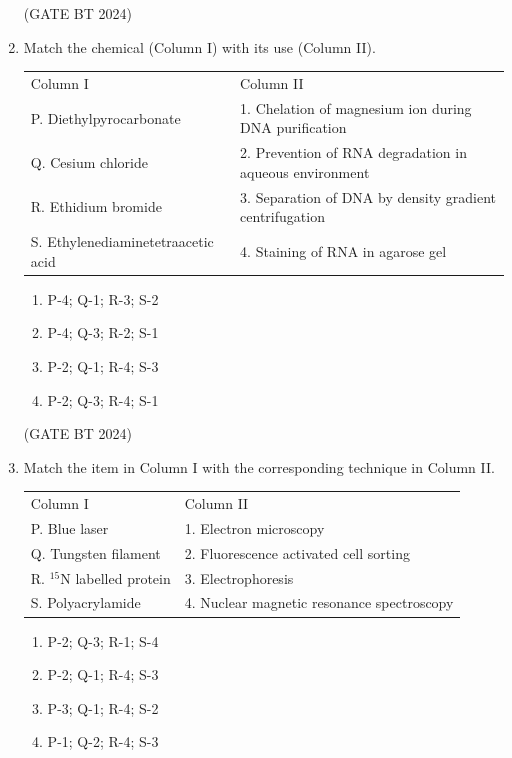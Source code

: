 \documentclass[journal,12pt,onecolumn]{IEEEtran}
\theoremstyle{remark}
\begin{document}
\begin{enumerate}
\hfill (GATE BT 2024)

\item Match the chemical (Column I) with its use (Column II).

\begin{tabular}{ll}
Column I & Column II \\
P. Diethylpyrocarbonate & 1. Chelation of magnesium ion during DNA purification \\
Q. Cesium chloride & 2. Prevention of RNA degradation in aqueous environment \\
R. Ethidium bromide & 3. Separation of DNA by density gradient centrifugation \\
S. Ethylenediaminetetraacetic acid & 4. Staining of RNA in agarose gel \\
\end{tabular}

\begin{enumerate}
    \item P-4; Q-1; R-3; S-2 
    \item P-4; Q-3; R-2; S-1 
    \item P-2; Q-1; R-4; S-3 
    \item P-2; Q-3; R-4; S-1
\end{enumerate}

\hfill (GATE BT 2024)

\item Match the item in Column I with the corresponding technique in Column II.

\begin{tabular}{ll}
Column I & Column II \\
P. Blue laser & 1. Electron microscopy \\
Q. Tungsten filament & 2. Fluorescence activated cell sorting \\
R. $^{15}$N labelled protein & 3. Electrophoresis \\
S. Polyacrylamide & 4. Nuclear magnetic resonance spectroscopy \\
\end{tabular}

\begin{enumerate}
    \item P-2; Q-3; R-1; S-4 
    \item P-2; Q-1; R-4; S-3 
    \item P-3; Q-1; R-4; S-2 
    \item P-1; Q-2; R-4; S-3
\end{enumerate}


\end{enumerate}
\end{document}
